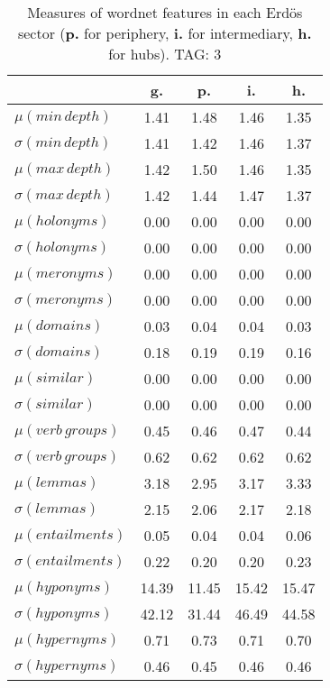\begin{table}[h!]
\begin{center}
\begin{tabular}{| l || c | c | c | c |}\hline
 & {\bf g.} & {\bf p.} & {\bf i.} & {\bf h.} \\\hline\hline
$\mu(min\,depth)$ & 1.41  & 1.48  & 1.46  & 1.35 \\
$\sigma(min\,depth)$ & 1.41  & 1.42  & 1.46  & 1.37 \\\hline
$\mu(max\,depth)$ & 1.42  & 1.50  & 1.46  & 1.35 \\
$\sigma(max\,depth)$ & 1.42  & 1.44  & 1.47  & 1.37 \\\hline
$\mu(holonyms)$ & 0.00  & 0.00  & 0.00  & 0.00 \\
$\sigma(holonyms)$ & 0.00  & 0.00  & 0.00  & 0.00 \\\hline
$\mu(meronyms)$ & 0.00  & 0.00  & 0.00  & 0.00 \\
$\sigma(meronyms)$ & 0.00  & 0.00  & 0.00  & 0.00 \\\hline
$\mu(domains)$ & 0.03  & 0.04  & 0.04  & 0.03 \\
$\sigma(domains)$ & 0.18  & 0.19  & 0.19  & 0.16 \\\hline
$\mu(similar)$ & 0.00  & 0.00  & 0.00  & 0.00 \\
$\sigma(similar)$ & 0.00  & 0.00  & 0.00  & 0.00 \\\hline
$\mu(verb\,groups)$ & 0.45  & 0.46  & 0.47  & 0.44 \\
$\sigma(verb\,groups)$ & 0.62  & 0.62  & 0.62  & 0.62 \\\hline
$\mu(lemmas)$ & 3.18  & 2.95  & 3.17  & 3.33 \\
$\sigma(lemmas)$ & 2.15  & 2.06  & 2.17  & 2.18 \\\hline
$\mu(entailments)$ & 0.05  & 0.04  & 0.04  & 0.06 \\
$\sigma(entailments)$ & 0.22  & 0.20  & 0.20  & 0.23 \\\hline
$\mu(hyponyms)$ & 14.39  & 11.45  & 15.42  & 15.47 \\
$\sigma(hyponyms)$ & 42.12  & 31.44  & 46.49  & 44.58 \\\hline
$\mu(hypernyms)$ & 0.71  & 0.73  & 0.71  & 0.70 \\
$\sigma(hypernyms)$ & 0.46  & 0.45  & 0.46  & 0.46 \\\hline
\end{tabular}
\caption{Measures of wordnet features in each Erd\"os sector ({{\bf p.}} for periphery, {{\bf i.}} for intermediary, {{\bf h.}} for hubs). TAG: 3}
\end{center}
\end{table}